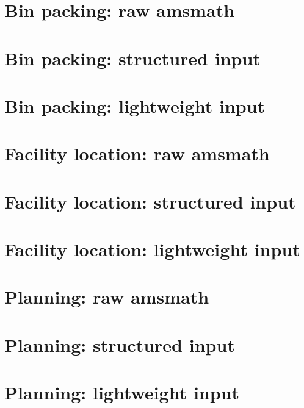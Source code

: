 \documentclass{article}
\newcommand{\comparisoninput}[2]{%
  \begingroup
  \let\comparisonlabel\label
  \renewcommand{\label}[1]{\comparisonlabel{#1:##1}}%
  \endgroup}
\begin{document}
\section*{Bin packing: raw amsmath}
\comparisoninput{raw}{bin-packing-raw}
\clearpage
\section*{Bin packing: structured input}
\comparisoninput{structured}{bin-packing-structured}
\clearpage
\section*{Bin packing: lightweight input}
\comparisoninput{light}{bin-packing-light}
\clearpage
\section*{Facility location: raw amsmath}
\comparisoninput{raw}{facility-location-raw}
\clearpage
\section*{Facility location: structured input}
\comparisoninput{structured}{facility-location-structured}
\clearpage
\section*{Facility location: lightweight input}
\comparisoninput{light}{facility-location-light}
\clearpage
\section*{Planning: raw amsmath}
\comparisoninput{raw}{planning-raw}
\clearpage
\section*{Planning: structured input}
\comparisoninput{structured}{planning-structured}
\clearpage
\section*{Planning: lightweight input}
\comparisoninput{light}{planning-light}
\end{document}
